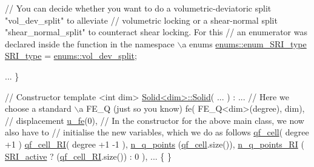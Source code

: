 \begin{DoxyCode}
    \textcolor{comment}{// You can decide whether you want to do a volumetric-deviatoric split "vol\_dev\_split" to alleviate}
    \textcolor{comment}{// volumetric locking or a shear-normal split "shear\_normal\_split" to counteract shear locking. For
       this}
    \textcolor{comment}{// an enumerator was declared inside the function in the namespace \(\backslash\)a enums}
     \hyperlink{namespaceenums_ad159a7d6539f111883db3b07c09601a8}{enums::enum\_SRI\_type} \hyperlink{classSolid_a0d12ca91579ebfa7c292b48506eca1e2}{SRI\_type} = 
      \hyperlink{namespaceenums_ad159a7d6539f111883db3b07c09601a8ad2c871b65148302b24a39fac6cedfd40}{enums::vol\_dev\_split};
    
     ...
\}


\textcolor{comment}{// Constructor}
\textcolor{keyword}{template} <\textcolor{keywordtype}{int} dim>
\hyperlink{assembly__routine__SRI_8cc_a031582e4b219de9cc57c78ebd20a2fc3}{Solid<dim>::Solid}( ... )
:
...
\textcolor{comment}{// Here we choose a standard \(\backslash\)a FE\_Q (just so you know)}
fe( FE\_Q<dim>(degree), dim),    \textcolor{comment}{// displacement}
\hyperlink{assembly__routine__SRI_8cc_ae50a49c136e49c33fcd5a555a00009dd}{u\_fe}(0),
\textcolor{comment}{// In the constructor for the above main class, we now also have to }
\textcolor{comment}{// initialise the new variables, which we do as follows}
\hyperlink{assembly__routine__SRI_8cc_aaaceb34a5b42a4954b2e893607c1bdef}{qf\_cell}( degree +1 )
\hyperlink{assembly__routine__SRI_8cc_ab9727a7376e2656d3cd40c65ac7efb81}{qf\_cell\_RI}( degree +1 -1 ),
\hyperlink{assembly__routine__SRI_8cc_afd52b693751274175b93a58458201e6b}{n\_q\_points} (\hyperlink{assembly__routine__SRI_8cc_aaaceb34a5b42a4954b2e893607c1bdef}{qf\_cell}.size()),
\hyperlink{assembly__routine__SRI_8cc_a0b72b2a33d52b7597b87df35b5b92415}{n\_q\_points\_RI} ( \hyperlink{assembly__routine__SRI_8cc_a535468030220abae9305a26e9d7f7401}{SRI\_active} ? (\hyperlink{assembly__routine__SRI_8cc_ab9727a7376e2656d3cd40c65ac7efb81}{qf\_cell\_RI}.size()) : 0 ),
...
\{
\}



\end{DoxyCode}
